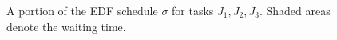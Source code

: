 \begin{sidewaysfigure}
  \begin{figure}[H]\centering
    \scalebox{0.7}{}
    \caption{A portion of the EDF schedule $\sigma$ for tasks $J_1, J_2, J_3$.
      Shaded areas denote the waiting time.}
    \label{fig:edf_6}
  \end{figure}

\end{sidewaysfigure}
